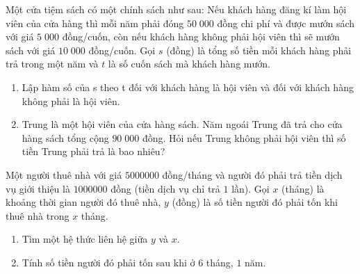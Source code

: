 \begin{bt}%
	Một cửa tiệm sách có một chính sách như sau: Nếu khách hàng đăng kí làm hội viên của cửa hàng thì mỗi năm phải đóng $50\;000$ đồng chi phí và được mướn sách với giá $5\;000$ đồng/cuốn, còn nếu khách hàng không phải hội viên thì sẽ mướn sách với giá $10\;000$ đồng/cuốn.
	Gọi $s$ (đồng) là tổng số tiền mỗi khách hàng phải trả trong một năm và $t$ là số cuốn sách mà khách hàng mướn.
	\begin{enumerate}
		\item Lập hàm số của s theo t đối với khách hàng là hội viên và đối với khách hàng không phải là hội viên.
		\item Trung là một hội viên của cửa hàng sách. Năm ngoái Trung đã trả cho cửa hàng sách tổng cộng $90\;000$ đồng. Hỏi nếu Trung không phải hội viên thì số tiền Trung phải trả là bao nhiêu?
	\end{enumerate}

\end{bt}

\begin{bt}%
	Một người thuê nhà với giá $5000000$ đồng/tháng và người đó phải trả tiền dịch vụ giới thiệu là $1000000$ đồng (tiền dịch vụ chỉ trả $1$ lần). Gọi $x$ (tháng) là khoảng thời gian người đó thuê nhà, $y$ (đồng) là số tiền người đó phải tốn khi thuê nhà trong $x$ tháng.
	\begin{enumerate}
		\item Tìm một hệ thức liên hệ giữa $y$ và $x$.
		\item Tính số tiền người đó phải tốn sau khi ở $6$ tháng, $1$ năm.
	\end{enumerate}
\end{bt}

